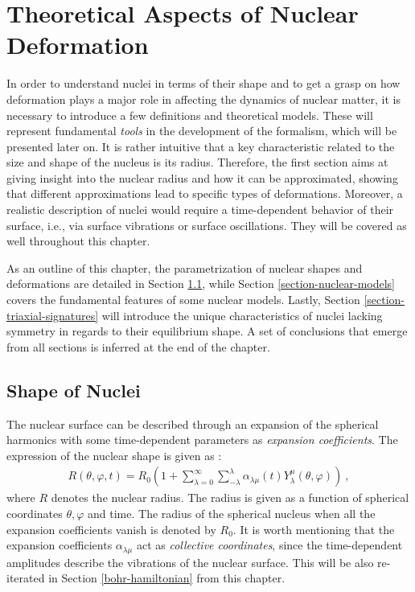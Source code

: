\chapter{Theoretical Aspects of Nuclear Deformation}
\label{chapter-2-theoretical-aspects}

In order to understand nuclei in terms of their shape and to get a grasp on how deformation plays a major role in affecting the dynamics of nuclear matter, it is necessary to introduce a few definitions and theoretical models. These will represent fundamental \emph{tools} in the development of the formalism, which will be presented later on. It is rather intuitive that a key characteristic related to the size and shape of the nucleus is its radius. Therefore, the first section aims at giving insight into the nuclear radius and how it can be approximated, showing that different approximations lead to specific types of deformations. Moreover, a realistic description of nuclei would require a time-dependent behavior of their surface, i.e., via surface vibrations or surface oscillations. They will be covered as well throughout this chapter.%

As an outline of this chapter, the parametrization of nuclear shapes and deformations are detailed in Section \ref{section-nuclear-shapes}, while Section \ref{section-nuclear-models} covers the fundamental features of some nuclear models. Lastly, Section \ref{section-triaxial-signatures} will introduce the unique characteristics of nuclei lacking symmetry in regards to their equilibrium shape. A set of conclusions that emerge from all sections is inferred at the end of the chapter.

\section{Shape of Nuclei}
\label{section-nuclear-shapes}

The nuclear surface can be described through an expansion of the spherical harmonics with some time-dependent parameters as \emph{expansion coefficients}. The expression of the nuclear shape is given as \cite{greiner1996nuclear}:
\begin{align}
    R(\theta,\varphi,t)=R_0\left(1+\sum_{\lambda=0}^\infty\sum_{-\lambda}^\lambda\alpha_{\lambda\mu}(t)Y_\lambda^\mu(\theta,\varphi)\right)\ ,
    \label{nuclear-shape}
\end{align}
where $R$ denotes the nuclear radius. The radius is given as a function of spherical coordinates $\theta,\varphi$ and time. The radius of the spherical nucleus when all the expansion coefficients vanish is denoted by $R_0$. It is worth mentioning that the expansion coefficients $\alpha_{\lambda\mu}$ act as \emph{collective coordinates}, since the time-dependent amplitudes describe the vibrations of the nuclear surface. This will be also re-iterated in Section \ref{bohr-hamiltonian} from this chapter.

